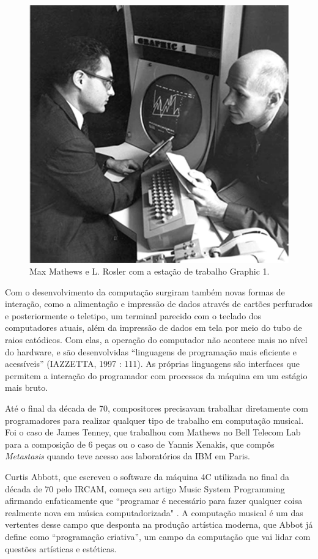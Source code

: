 \begin{figure}[ht]
    \caption{\label{max}Max Mathews e L. Rosler com a estação de trabalho Graphic 1. }
    \begin{center}
        \includegraphics[width=0.5\linewidth]{pictures/MaxHolmes-251}
    \end{center}
\end{figure}

Com o desenvolvimento da computação surgiram também novas formas de interação, como a alimentação e impressão de dados através de cartões perfurados e posteriormente o teletipo, um terminal parecido com o teclado dos computadores atuais, além da impressão de dados em tela por meio do tubo de raios catódicos. Com elas, a operação do computador não acontece mais no nível do hardware, e são desenvolvidas ``linguagens de programação mais eficiente e acessíveis'' (IAZZETTA, 1997 : 111). As próprias linguagens são interfaces que permitem a interação do programador com processos da máquina em um estágio mais bruto.

Até o final da década de 70, compositores precisavam trabalhar diretamente com programadores para realizar qualquer tipo de trabalho em computação musical. Foi o caso de James Tenney, que trabalhou com Mathews no Bell Telecom Lab para a composição de 6 peças ou o caso de Yannis Xenakis, que compôs \emph{Metastasis} quando teve acesso aos laboratórios da IBM em Paris\cite{Holmes1985}. 



Curtis Abbott, que escreveu o software da máquina 4C utilizada no final da década de 70 pelo IRCAM, começa seu artigo Music System Programming afirmando enfaticamente que ``programar é necessário para fazer qualquer coisa realmente nova em música computadorizada" \cite[51]{Roads1996}. A computação musical é um das vertentes desse campo que desponta na produção artística moderna, que Abbot já define como ``programação criativa'', um campo da computação que vai lidar com questões artísticas e estéticas. 

